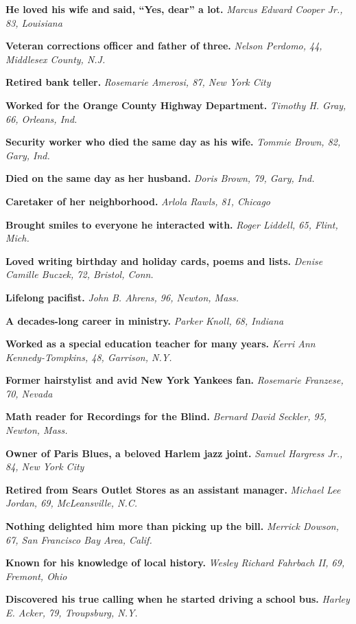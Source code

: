 \textbf{He loved his wife and said, ``Yes, dear'' a lot.} \emph{Marcus
Edward Cooper Jr., 83, Louisiana}

\textbf{Veteran corrections officer and father of three.} \emph{Nelson
Perdomo, 44, Middlesex County, N.J.}

\textbf{Retired bank teller.} \emph{Rosemarie Amerosi, 87, New York
City}

\textbf{Worked for the Orange County Highway Department.} \emph{Timothy
H. Gray, 66, Orleans, Ind.}

\textbf{Security worker who died the same day as his wife.} \emph{Tommie
Brown, 82, Gary, Ind.}

\textbf{Died on the same day as her husband.} \emph{Doris Brown, 79,
Gary, Ind.}

\textbf{Caretaker of her neighborhood.} \emph{Arlola Rawls, 81, Chicago}

\textbf{Brought smiles to everyone he interacted with.} \emph{Roger
Liddell, 65, Flint, Mich.}

\textbf{Loved writing birthday and holiday cards, poems and lists.}
\emph{Denise Camille Buczek, 72, Bristol, Conn.}

\textbf{Lifelong pacifist.} \emph{John B. Ahrens, 96, Newton, Mass.}

\textbf{A decades-long career in ministry.} \emph{Parker Knoll, 68,
Indiana}

\textbf{Worked as a special education teacher for many years.}
\emph{Kerri Ann Kennedy-Tompkins, 48, Garrison, N.Y.}

\textbf{Former hairstylist and avid New York Yankees fan.}
\emph{Rosemarie Franzese, 70, Nevada}

\textbf{Math reader for Recordings for the Blind.} \emph{Bernard David
Seckler, 95, Newton, Mass.}

\textbf{Owner of Paris Blues, a beloved Harlem jazz joint.} \emph{Samuel
Hargress Jr., 84, New York City}

\textbf{Retired from Sears Outlet Stores as an assistant manager.}
\emph{Michael Lee Jordan, 69, McLeansville, N.C.}

\textbf{Nothing delighted him more than picking up the bill.}
\emph{Merrick Dowson, 67, San Francisco Bay Area, Calif.}

\textbf{Known for his knowledge of local history.} \emph{Wesley Richard
Fahrbach II, 69, Fremont, Ohio}

\textbf{Discovered his true calling when he started driving a school
bus.} \emph{Harley E. Acker, 79, Troupsburg, N.Y.}

